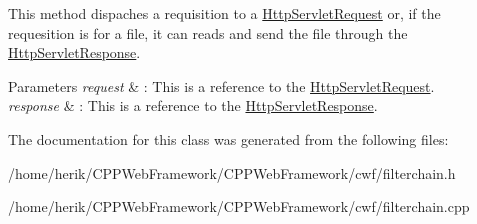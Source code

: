 This method dispaches a requisition to a \hyperlink{class_http_servlet_request}{Http\+Servlet\+Request} or, if the requesition is for a file, it can reads and send the file through the \hyperlink{class_http_servlet_response}{Http\+Servlet\+Response}. 


\begin{DoxyParams}{Parameters}
{\em request} & \+: This is a reference to the \hyperlink{class_http_servlet_request}{Http\+Servlet\+Request}. \\
\hline
{\em response} & \+: This is a reference to the \hyperlink{class_http_servlet_response}{Http\+Servlet\+Response}. \\
\hline
\end{DoxyParams}


The documentation for this class was generated from the following files\+:\begin{DoxyCompactItemize}
\item 
/home/herik/\+C\+P\+P\+Web\+Framework/\+C\+P\+P\+Web\+Framework/cwf/filterchain.\+h\item 
/home/herik/\+C\+P\+P\+Web\+Framework/\+C\+P\+P\+Web\+Framework/cwf/filterchain.\+cpp\end{DoxyCompactItemize}

